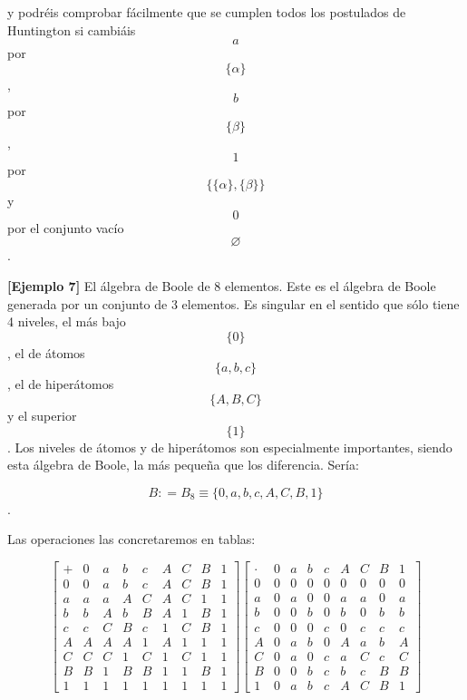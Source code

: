 \begin{enumerate}
  y podréis comprobar fácilmente que se cumplen todos los postulados de
  Huntington si cam\-biáis \[a\] por \[\{\alpha\}\], \[b\] por
  \[\{\beta\}\], \[1\] por \[\{{{\{\alpha\}},{\{\beta\}}}\}\] y \[0\]
  por el conjunto vacío \[\varnothing\].

  \textbf{{[}Ejemplo 7{]}} El álgebra de Boole de 8 elementos. Este es
  el álgebra de Boole generada por un conjunto de 3 elementos. Es
  singular en el sentido que sólo tiene 4 niveles, el más bajo
  \[\{ 0\}\], el de átomos \[\{{a,b,c}\}\], el de hiperátomos
  \[\{{A,B,C}\}\] y el superior \[\{ 1\}\]. Los niveles de átomos y de
  hiperátomos son especialmente importantes, siendo esta álge\-bra de
  Boole, la más pequeña que los diferencia. Sería:

  \[B{{: = B_{8}} \equiv {\{{0,a,b,c,A,C,B,1}\}}}\].

  Las operaciones las concretaremos en tablas:

  \[\begin{bmatrix}
   + & 0 & a & b & c & A & C & B & 1 \\
  0 & 0 & a & b & c & A & C & B & 1 \\
  a & a & a & A & C & A & C & 1 & 1 \\
  b & b & A & b & B & A & 1 & B & 1 \\
  c & c & C & B & c & 1 & C & B & 1 \\
  A & A & A & A & 1 & A & 1 & 1 & 1 \\
  C & C & C & 1 & C & 1 & C & 1 & 1 \\
  B & B & 1 & B & B & 1 & 1 & B & 1 \\
  1 & 1 & 1 & 1 & 1 & 1 & 1 & 1 & 1
  \end{bmatrix}\begin{bmatrix}
   \cdot & 0 & a & b & c & A & C & B & 1 \\
  0 & 0 & 0 & 0 & 0 & 0 & 0 & 0 & 0 \\
  a & 0 & a & 0 & 0 & a & a & 0 & a \\
  b & 0 & 0 & b & 0 & b & 0 & b & b \\
  c & 0 & 0 & 0 & c & 0 & c & c & c \\
  A & 0 & a & b & 0 & A & a & b & A \\
  C & 0 & a & 0 & c & a & C & c & C \\
  B & 0 & 0 & b & c & b & c & B & B \\
  1 & 0 & a & b & c & A & C & B & 1
  \end{bmatrix}\]


\end{enumerate}

